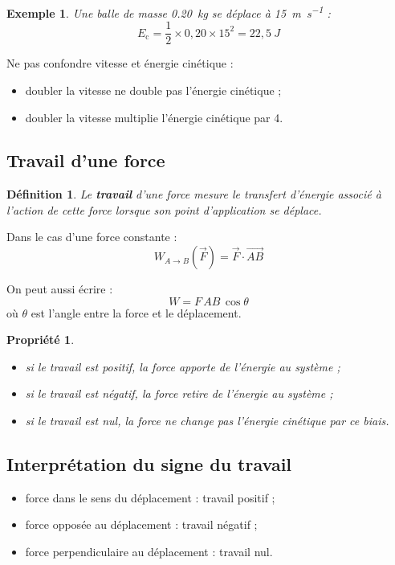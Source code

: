 \documentclass[11pt,a4paper]{article}
\newtheorem{definition}{Définition}[section]
\newtheorem{propriete}{Propriété}[section]
\newtheorem{exemple}{Exemple}[section]
\newcommand{\Ec}{E_\mathrm{c}}
\begin{document}
\begin{exemple}
Une balle de masse \SI{0,20}{kg} se déplace à \SI{15}{m.s^{-1}} :
\[
\Ec=\frac12\times 0,20\times 15^2
=22,5\ \si{J}
\]
\end{exemple}

\begin{attentionbox}
Ne pas confondre vitesse et énergie cinétique :
\begin{itemize}
    \item doubler la vitesse ne double pas l'énergie cinétique ;
    \item doubler la vitesse multiplie l'énergie cinétique par 4.
\end{itemize}
\end{attentionbox}

\subsection{Travail d'une force}

\begin{definition}
Le \textbf{travail} d'une force mesure le transfert d'énergie associé à l'action de cette force lorsque son point d'application se déplace.
\end{definition}

Dans le cas d'une force constante :
\[
W_{A\to B}(\vec{F}) = \vec{F}\cdot \vec{AB}
\]

On peut aussi écrire :
\[
W=F\,AB\,\cos\theta
\]
où $\theta$ est l'angle entre la force et le déplacement.

\begin{propriete}
\begin{itemize}
    \item si le travail est positif, la force apporte de l'énergie au système ;
    \item si le travail est négatif, la force retire de l'énergie au système ;
    \item si le travail est nul, la force ne change pas l'énergie cinétique par ce biais.
\end{itemize}
\end{propriete}

\subsection{Interprétation du signe du travail}

\begin{itemize}
    \item force dans le sens du déplacement : travail positif ;
    \item force opposée au déplacement : travail négatif ;
    \item force perpendiculaire au déplacement : travail nul.
\end{itemize}
\end{document}

